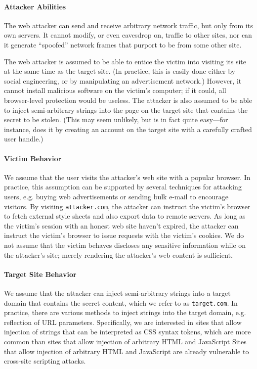 \documentclass{acm_proc_article-sp}
\begin{document}
\paragraph{Attacker Abilities}
The web attacker can send and receive arbitrary network traffic, but
only from its own servers.  It cannot modify, or even eavesdrop on,
traffic to other sites, nor can it generate “spoofed” network frames
that purport to be from some other site.

The web attacker is assumed to be able to entice the victim into
visiting its site at the same time as the target site.  (In practice,
this is easily done either by social engineering, or by manipulating
an advertisement network.)  However, it cannot install malicious
software on the victim's computer; if it could, all browser-level
protection would be useless.  The attacker is also assumed to be able
to inject semi-arbitrary strings into the page on the target site that
contains the secret to be stolen.  (This may seem unlikely, but is in
fact quite easy---for instance, \cite{cssxss08} does it by creating an
account on the target site with a carefully crafted user handle.)

\paragraph{Victim Behavior}
We assume that the user visits the attacker's web site with a popular
browser. In practice, this assumption can be supported by several
techniques for attacking users, e.g. buying web advertisements or
sending bulk e-mail to encourage visitors. By visiting
\texttt{attacker.com}, the attacker can instruct the victim's browser
to fetch external style sheets and also export data to remote
servers. As long as the victim's session with an honest web site
haven't expired, the attacker can instruct the victim's browser to
issue requests with the victim's cookies.  We do not assume that the
victim behaves discloses any sensitive information while on the
attacker's site; merely rendering the attacker's web content is
sufficient.

\paragraph{Target Site Behavior}
We assume that the attacker can inject semi-arbitrary strings into a
target domain that contains the secret content, which we refer to as
\texttt{target.com}. In practice, there are various methods to inject
strings into the target domain, e.g. reflection of URL
parameters. Specifically, we are interested in sites that allow
injection of strings that can be interpreted as CSS syntax tokens,
which are more common than sites that allow injection of arbitrary
HTML and JavaScript Sites that allow injection of arbitrary HTML and
JavaScript are already vulnerable to cross-site scripting attacks.
\end{document}
